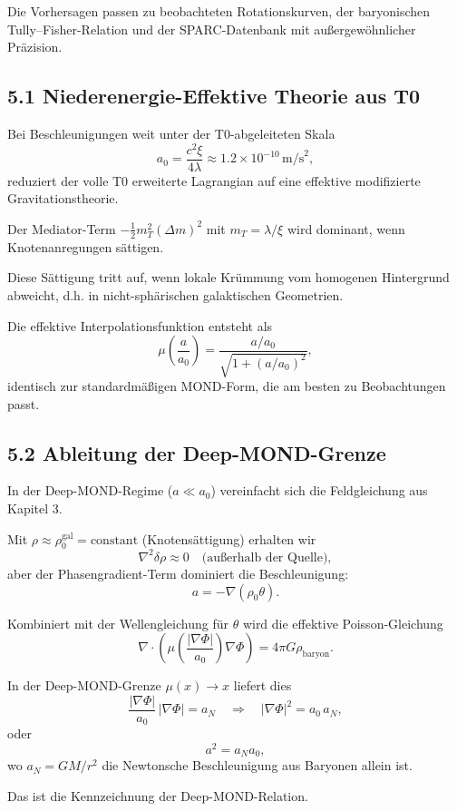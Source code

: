 	Die Vorhersagen passen zu beobachteten Rotationskurven, der baryonischen Tully–Fisher-Relation und der SPARC-Datenbank mit außergewöhnlicher Präzision.
	
	\subsection{5.1 Niederenergie-Effektive Theorie aus T0}
	
	Bei Beschleunigungen weit unter der T0-abgeleiteten Skala
	\[
	a_0 = \frac{c^2 \xi}{4 \lambda} \approx 1.2 \times 10^{-10} \, \text{m/s}^2,
	\]
	reduziert der volle T0 erweiterte Lagrangian auf eine effektive modifizierte Gravitationstheorie.
	
	Der Mediator-Term $-\frac{1}{2} m_T^2 (\Delta m)^2$ mit $m_T = \lambda / \xi$ wird dominant, wenn Knotenanregungen sättigen.
	
	Diese Sättigung tritt auf, wenn lokale Krümmung vom homogenen Hintergrund abweicht, d.h. in nicht-sphärischen galaktischen Geometrien.
	
	Die effektive Interpolationsfunktion entsteht als
	\[
	\mu\left(\frac{a}{a_0}\right) = \frac{a / a_0}{\sqrt{1 + (a / a_0)^2}},
	\]
	identisch zur standardmäßigen MOND-Form, die am besten zu Beobachtungen passt.
	
	\subsection{5.2 Ableitung der Deep-MOND-Grenze}
	
	In der Deep-MOND-Regime ($a \ll a_0$) vereinfacht sich die Feldgleichung aus Kapitel 3.
	
	Mit $\rho \approx \rho_0^{\text{gal}} = \text{constant}$ (Knotensättigung) erhalten wir
	\[
	\nabla^2 \delta \rho \approx 0 \quad \text{(außerhalb der Quelle)},
	\]
	aber der Phasengradient-Term dominiert die Beschleunigung:
	\[
	a = -\nabla (\rho_0 \theta).
	\]
	
	Kombiniert mit der Wellengleichung für $\theta$ wird die effektive Poisson-Gleichung
	\[
	\nabla \cdot \left( \mu\left(\frac{|\nabla \Phi|}{a_0}\right) \nabla \Phi \right) = 4\pi G \rho_{\text{baryon}}.
	\]
	
	In der Deep-MOND-Grenze $\mu(x) \to x$ liefert dies
	\[
	\frac{|\nabla \Phi|}{a_0}\,|\nabla \Phi| = a_N \quad\Rightarrow\quad |\nabla \Phi|^2 = a_0\, a_N,
	\]
	oder
	\[
	a^2 = a_N a_0,
	\]
	wo $a_N = GM/r^2$ die Newtonsche Beschleunigung aus Baryonen allein ist.
	
	Das ist die Kennzeichnung der Deep-MOND-Relation.
	
